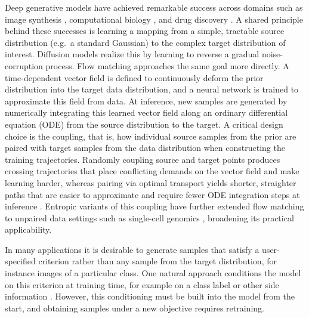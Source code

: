 \documentclass{article}
\begin{document}
Deep generative models have achieved remarkable success across domains such as image synthesis \citep{rombach2022highresolution}, computational biology \citep{klein2025cellflow}, and drug discovery \citep{jumper2021alphafold}.
A shared principle behind these successes is learning a mapping from a simple, tractable source distribution (e.g.\ a standard Gaussian) to the complex target distribution of interest.
Diffusion models \citep{ho2020denoising, song2021score, rombach2022highresolution} realize this by learning to reverse a gradual noise-corruption process.
Flow matching \citep{lipman2023flow} approaches the same goal more directly.
A time-dependent vector field is defined to continuously deform the prior distribution into the target data distribution, and a neural network is trained to approximate this field from data.
At inference, new samples are generated by numerically integrating this learned vector field along an ordinary differential equation (ODE) from the source distribution to the target.
A critical design choice is the coupling, that is, how individual source samples from the prior are paired with target samples from the data distribution when constructing the training trajectories.
Randomly coupling source and target points produces crossing trajectories that place conflicting demands on the vector field and make learning harder, whereas pairing via optimal transport yields shorter, straighter paths that are easier to approximate and require fewer ODE integration steps at inference \citep{tong2024improving}.
Entropic variants of this coupling have further extended flow matching to unpaired data settings such as single-cell genomics \citep{klein2024genot}, broadening its practical applicability.

In many applications it is desirable to generate samples that satisfy a user-specified criterion rather than any sample from the target distribution, for instance images of a particular class.
One natural approach conditions the model on this criterion at training time, for example on a class label or other side information \citep{ho2022classifier}.
However, this conditioning must be built into the model from the start, and obtaining samples under a new objective requires retraining.
\end{document}
